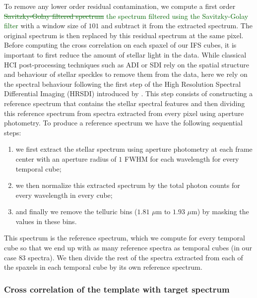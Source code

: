 \documentclass[referee]{aa} %
\newcommand{\newchange}[1]{\textcolor{darkgreen}{#1}}
\begin{document}
To remove any lower order residual contamination, we compute a first order \newchange{\sout{Savitzky-Golay filtered spectrum } the spectrum filtered using the Savitzky-Golay filter \citep{1964SavitzkyGolay}} with a window size of $101$ and subtract it from the extracted spectrum. The original spectrum is then replaced by this residual spectrum at the same pixel.
Before computing the cross correlation on each spaxel of our IFS cubes, it is important to first reduce the amount of stellar light in the data. 
While classical HCI post-processing techniques such as ADI or SDI rely on the spatial structure and behaviour of stellar speckles to remove them from the data, here we rely on the spectral behaviour following the first step of the High Resolution Spectral Differential Imaging (HRSDI) introduced by \citet{2019Haffert}. 
This step consists of constructing a reference spectrum that contains the stellar spectral features and then dividing \citep[or subtracting, in the case of][]{2019Haffert} this reference spectrum from spectra extracted from every pixel using aperture photometry. 
To produce a reference spectrum we have the following sequential steps:
\begin{enumerate}
    \item we first extract the stellar spectrum using aperture photometry at each frame center with an aperture radius of $1$ FWHM for each wavelength for every temporal cube;
    \item we then normalize this extracted spectrum by the total photon counts for every wavelength in every cube;
    \item and finally we remove the telluric bins ($1.81$ $\mu$m to $1.93$ $\mu$m) by masking the values in these bins.
\end{enumerate}
This spectrum is the reference spectrum, which we compute for every temporal cube so that we end up with as many reference spectra as temporal cubes (in our case $83$ spectra).
We then divide the rest of the spectra extracted from each of the spaxels in each temporal cube by its own reference spectrum.

\subsubsection{Cross correlation of the template with target spectrum}\label{sec: CC algorithm}
\end{document}
